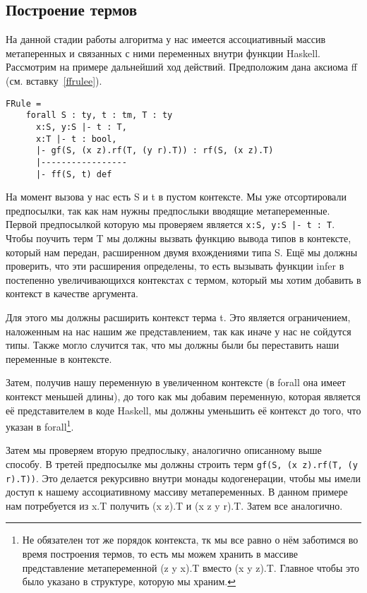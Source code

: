 \subsection{Построение термов}\label{build_exp}
На данной стадии работы алгоритма у нас имеется ассоциативный массив метаперенных и связанных с ними переменных внутри функции Haskell. Рассмотрим на примере дальнейший ход действий. Предположим дана аксиома ff (см. вставку~\ref{ffrulee}).

\begin{lstlisting}[label={ffrulee}, caption={Искусственное правило вывода для конструкции ff},captionpos=b, frame=single, float, floatplacement=H]
FRule =
    forall S : ty, t : tm, T : ty
      x:S, y:S |- t : T,
      x:T |- t : bool,
      |- gf(S, (x z).rf(T, (y r).T)) : rf(S, (x z).T)
      |-----------------
      |- ff(S, t) def
\end{lstlisting}

На момент вызова у нас есть S и t в пустом контексте. Мы уже отсортировали предпосылки, так как нам нужны предпослыки вводящие метапеременные. Первой предпосылкой которую мы проверяем является \lstinline{x:S, y:S |- t : T}. Чтобы поучить терм T мы должны вызвать функцию вывода типов в контексте, который нам передан, расширенном двумя вхождениями типа S. Ещё мы должны проверить, что эти расширения определены, то есть вызывать функции infer в постепенно увеличивающихся контекстах с термом, который мы хотим добавить в контекст в качестве аргумента.

Для этого мы должны расширить контекст терма t. Это является ограничением, наложенным на нас нашим же представлением, так как иначе у нас не сойдутся типы. Также могло случится так, что мы должны были бы переставить наши переменные в контексте.

Затем, получив нашу переменную в увеличенном контексте (в forall она имеет контекст меньшей длины), до того как мы добавим переменную, которая является её представителем в коде Haskell, мы должны уменьшить её контекст до того, что указан в forall\footnote{Не обязателен тот же порядок контекста, тк мы все равно о нём заботимся во время построения термов, то есть мы можем хранить в массиве представление метапеременной (z y x).T вместо (x y z).T. Главное чтобы это было указано в структуре, которую мы храним.}.

Затем мы проверяем вторую предпослыку, аналогично описанному выше способу. В третей предпосылке мы должны строить терм \lstinline{gf(S, (x z).rf(T, (y r).T))}. Это делается рекурсивно внутри монады кодогенерации, чтобы мы имели доступ к нашему ассоциативному массиву метапеременных. В данном примере нам потребуется из x.T получить (x z).T и (x z y r).T. Затем все аналогично.

